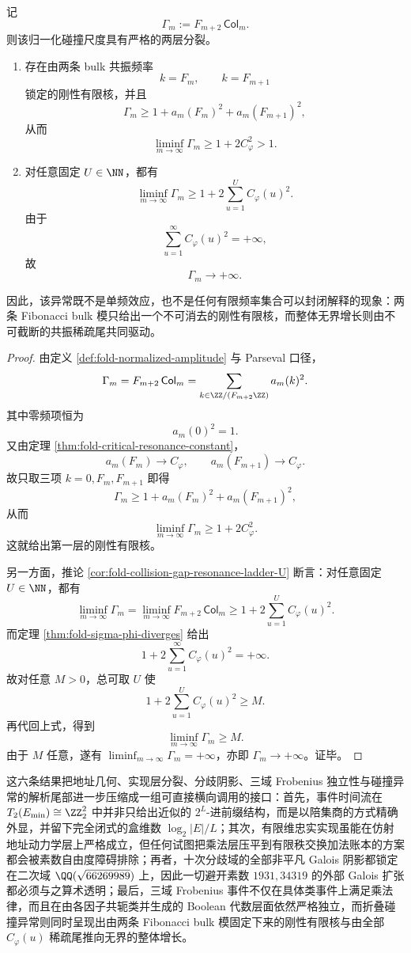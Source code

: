\begin{theorem}[共振异常的刚性有限核与不可截断无限尾]\label{thm:xi-time-part75-resonance-anomaly-rigid-core-infinite-tail}
记
\[
\Gamma_m:=F_{m+2}\,\mathsf{Col}_m.
\]
则该归一化碰撞尺度具有严格的两层分裂。
\begin{enumerate}
  \item 存在由两条 bulk 共振频率
  \[
  k=F_m,\qquad k=F_{m+1}
  \]
  锁定的刚性有限核，并且
  \[
  \Gamma_m\ge 1+a_m(F_m)^2+a_m(F_{m+1})^2,
  \]
  从而
  \[
  \liminf_{m\to\infty}\Gamma_m\ge 1+2C_\varphi^2>1.
  \]
  \item 对任意固定 \(U\in\NN\)，都有
  \[
  \liminf_{m\to\infty}\Gamma_m
  \ge
  1+2\sum_{u=1}^{U}C_\varphi(u)^2.
  \]
  由于
  \[
  \sum_{u=1}^{\infty}C_\varphi(u)^2=+\infty,
  \]
  故
  \[
  \Gamma_m\longrightarrow +\infty.
  \]
\end{enumerate}
因此，该异常既不是单频效应，也不是任何有限频率集合可以封闭解释的现象：两条 Fibonacci bulk 模只给出一个不可消去的刚性有限核，而整体无界增长则由不可截断的共振稀疏尾共同驱动。
\end{theorem}
\begin{proof}
由定义 \ref{def:fold-normalized-amplitude} 与 Parseval 口径，
\[
\Gamma_m=F_{m+2}\,\mathsf{Col}_m=\sum_{k\in \ZZ/(F_{m+2}\ZZ)}a_m(k)^2.
\]
其中零频项恒为
\[
a_m(0)^2=1.
\]
又由定理 \ref{thm:fold-critical-resonance-constant}，
\[
a_m(F_m)\longrightarrow C_\varphi,
\qquad
a_m(F_{m+1})\longrightarrow C_\varphi.
\]
故只取三项 \(k=0,F_m,F_{m+1}\) 即得
\[
\Gamma_m\ge 1+a_m(F_m)^2+a_m(F_{m+1})^2,
\]
从而
\[
\liminf_{m\to\infty}\Gamma_m\ge 1+2C_\varphi^2.
\]
这就给出第一层的刚性有限核。

另一方面，推论 \ref{cor:fold-collision-gap-resonance-ladder-U} 断言：对任意固定 \(U\in\NN\)，都有
\[
\liminf_{m\to\infty}\Gamma_m
=
\liminf_{m\to\infty}F_{m+2}\,\mathsf{Col}_m
\ge
1+2\sum_{u=1}^{U}C_\varphi(u)^2.
\]
而定理 \ref{thm:fold-sigma-phi-diverges} 给出
\[
1+2\sum_{u=1}^{\infty}C_\varphi(u)^2=+\infty.
\]
故对任意 \(M>0\)，总可取 \(U\) 使
\[
1+2\sum_{u=1}^{U}C_\varphi(u)^2\ge M.
\]
再代回上式，得到
\[
\liminf_{m\to\infty}\Gamma_m\ge M.
\]
由于 \(M\) 任意，遂有 \(\liminf_{m\to\infty}\Gamma_m=+\infty\)，亦即 \(\Gamma_m\to+\infty\)。证毕。
\end{proof}

\noindent
这六条结果把地址几何、实现层分裂、分歧阴影、三域 Frobenius 独立性与碰撞异常的解析尾部进一步压缩成一组可直接横向调用的接口：首先，事件时间流在 \(T_2(E_{\min})\cong \ZZ_2^2\) 中并非只给出近似的 \(2^L\)-进前缀结构，而是以陪集商的方式精确外显，并留下完全闭式的盒维数 \(\log_2|E|/L\)；其次，有限维忠实实现虽能在仿射地址动力学层上严格成立，但任何试图把乘法层压平到有限秩交换加法账本的方案都会被素数自由度障碍排除；再者，十次分歧域的全部非平凡 Galois 阴影都锁定在二次域 \(\QQ(\sqrt{66269989})\) 上，因此一切避开素数 \(1931,34319\) 的外部 Galois 扩张都必须与之算术透明；最后，三域 Frobenius 事件不仅在具体类事件上满足乘法律，而且在由各因子共轭类并生成的 Boolean 代数层面依然严格独立，而折叠碰撞异常则同时呈现出由两条 Fibonacci bulk 模固定下来的刚性有限核与由全部 \(C_\varphi(u)\) 稀疏尾推向无界的整体增长。



\endinput
